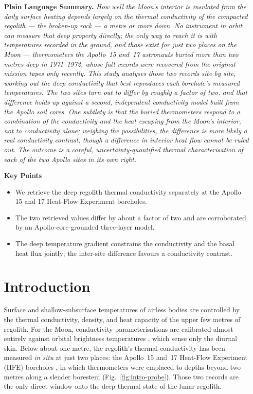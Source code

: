 \documentclass[11pt]{article}
\newenvironment{plainlanguagesummary}{%
  \par\medskip\noindent\textbf{Plain Language Summary.}\itshape\small}{\par\medskip}
\begin{document}
\begin{plainlanguagesummary}
How well the Moon's interior is insulated from the daily surface
heating depends largely on the thermal conductivity of the compacted
regolith --- the broken-up rock --- a metre or more down. No
instrument in orbit can measure that deep property directly; the only
way to reach it is with temperatures recorded in the ground,
and those exist for just two places on the Moon --- thermometers the
Apollo~15 and~17 astronauts buried more than two metres deep in
1971--1972, whose full records were recovered from the original
mission tapes only recently. This study analyses those two records
site by site, working out the deep conductivity that best reproduces
each borehole's measured temperatures. The two sites turn out to
differ by roughly a factor of two, and that difference holds up
against a second, independent conductivity model built from the
Apollo soil cores. One subtlety is that the buried thermometers
respond to a combination of the conductivity and the heat escaping
from the Moon's interior, not to conductivity alone; weighing the
possibilities, the difference is more likely a real conductivity
contrast, though a difference in interior heat flow cannot be ruled
out. The outcome is a careful, uncertainty-quantified thermal
characterisation of each of the two Apollo sites in its own right.
\end{plainlanguagesummary}

\medskip
\noindent\textbf{Key Points}
\begin{itemize}\itemsep2pt
  \item We retrieve the deep regolith thermal conductivity separately
        at the Apollo 15 and 17 Heat-Flow Experiment boreholes.
  \item The two retrieved values differ by about a factor of two and
        are corroborated by an Apollo-core-grounded three-layer model.
  \item The deep temperature gradient constrains the conductivity and
        the basal heat flux jointly; the inter-site difference favours
        a conductivity contrast.
\end{itemize}

\section{Introduction}\label{sec:intro}

Surface and shallow-subsurface temperatures of airless bodies are
controlled by the thermal conductivity, density, and heat capacity of
the upper few metres of regolith. For the Moon, conductivity
parameterisations are calibrated almost entirely against orbital
brightness temperatures \citep{vasavada2012,hayne2017}, which sense
only the diurnal skin. Below about one metre, the regolith's thermal
conductivity has been measured \emph{in situ} at just two places: the
Apollo~15 and~17 Heat-Flow Experiment (HFE) boreholes
\citep{langseth1976,nagihara2018}, in which thermometers were emplaced
to depths beyond two metres along a slender borestem
(Fig.~\ref{fig:intro-probe}). Those two records are the only
direct window onto the deep thermal state of the lunar regolith.
\end{document}
